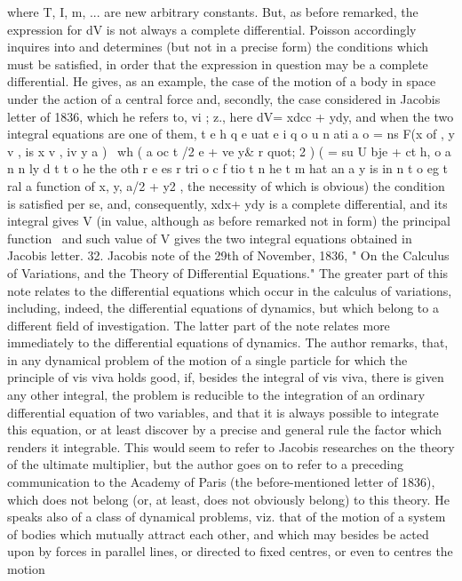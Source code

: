 \documentclass[12pt,a4paper]{article}
\theoremstyle{definition}
\begin{document}

where T, I, m, ... are new arbitrary constants. But, as before remarked, the expression
for dV is not always a complete differential. Poisson accordingly inquires into and
determines (but not in a precise form) the conditions which must be satisfied, in order
that the expression in question may be a complete differential. He gives, as an
example, the case of the motion of a body in space under the action of a central
force and, secondly, the case considered in Jacobis letter of 1836, which he refers
to, vi ; z., here dV= xdcc + ydy, and when the two integral equations are one of them,
t e h q e uat e i q o u n ati a o = ns F(x of , y v , is x v , iv y a ) \ wh ( a oc t /2 e + ve y& r quot; 2 ) ( = su U bje + ct h, o a n n ly d t t o he the oth r e es r tri o c f tio t n he t m hat an a y is in n t o eg t ral a
function of x, y, a/2 + y2 , the necessity of which is obvious) the condition is satisfied
per se, and, consequently, xdx+ ydy is a complete differential, and its integral gives
V
(in value, although as before remarked not in form) the principal function \ and
such value of V gives the two integral equations obtained in Jacobis letter.
32. Jacobis note of the 29th of November, 1836, " On the Calculus of Variations,
and the Theory of Differential Equations." The greater part of this note relates to
the differential equations which occur in the calculus of variations, including, indeed,
the differential equations of dynamics, but which belong to a different field of
investigation. The latter part of the note relates more immediately to the differential
equations of dynamics. The author remarks, that, in any dynamical problem of the
motion of a single particle for which the principle of vis viva holds good, if, besides
the integral of vis viva, there is given any other integral, the problem is reducible
to the integration of an ordinary differential equation of two variables, and that it is
always possible to integrate this equation, or at least discover by a precise and general
rule the factor which renders it integrable. This would seem to refer to Jacobis
researches on the theory of the ultimate multiplier, but the author goes on to refer
to a preceding communication to the Academy of Paris (the before-mentioned letter
of 1836), which does not belong (or, at least, does not obviously belong) to this theory.
He speaks also of a class of dynamical problems, viz. that of the motion of a system
of bodies which mutually attract each other, and which may besides be acted upon
by forces in parallel lines, or directed to fixed centres, or even to centres the motion
\end{document}
